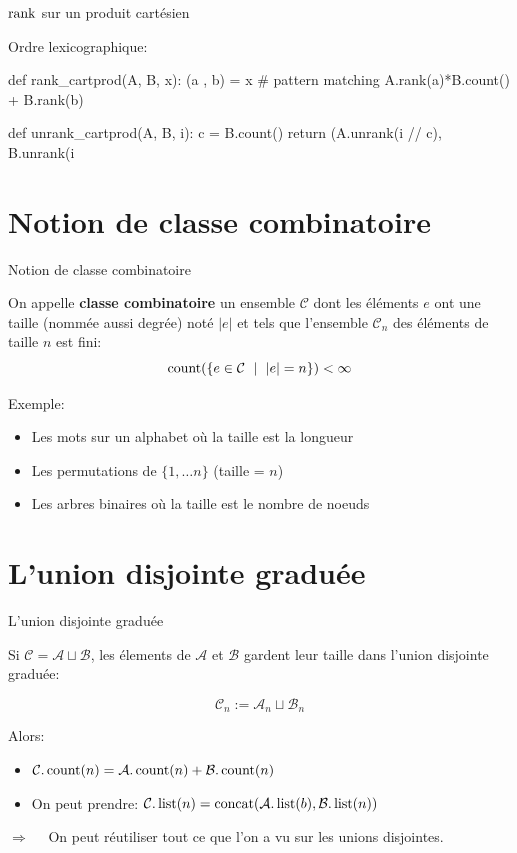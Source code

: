 \documentclass{beamer}
\begin{document}
\begin{frame}[fragile]{$\operatorname{rank}$ sur un produit cartésien}

  Ordre lexicographique:
  \bigskip
\begin{listing}{1}
    def rank_cartprod(A, B, x):
        (a , b) = x      # pattern matching
        A.rank(a)*B.count() + B.rank(b)

    def unrank_cartprod(A, B, i):
        c = B.count()
        return (A.unrank(i // c), B.unrank(i %
\end{listing}
\end{frame}


\newcommand{\mA}{\mathcal{A}}
\newcommand{\mB}{\mathcal{B}}
\newcommand{\mC}{\mathcal{C}}
\newcommand{\mD}{\mathcal{D}}
\newcommand{\mE}{\mathcal{E}}
\newcommand{\mI}{\mathcal{I}}
\newcommand{\mZ}{\mathcal{Z}}
\section{Notion de classe combinatoire}

\begin{frame}{Notion de classe combinatoire}
  \begin{DEFN}
    On appelle \textbf{classe combinatoire} un ensemble $\mC$ dont les éléments
    $e$ ont une taille (nommée aussi degrée) noté $|e|$ et tels que l'ensemble
    $\mC_n$ des éléments de taille $n$ est fini:
    \[
    \Count(\{e\in \mC\ \mid\ |e| = n\}) < \infty
    \]
  \end{DEFN}
  Exemple:
  \begin{itemize}
  \item Les mots sur un alphabet où la taille est la longueur
  \item Les permutations de $\{1,\dots n\}$ (taille = $n$)
  \item Les arbres binaires où la taille est le nombre de noeuds
  \end{itemize}
\end{frame}

\section{L'union disjointe graduée}
\begin{frame}{L'union disjointe graduée}

  Si $\mC = \mA \sqcup \mB$, les élements de $\mA$ et $\mB$ gardent leur
  taille dans l'union disjointe graduée:

  \[\mC_n := \mA_n \sqcup \mB_n\]

  Alors:
  \begin{itemize}
  \item $\mC.\Count(n) = \mA.\Count(n) + \mB.\Count(n)$
  \item On peut prendre: $\mC.\List(n) = \Concat(\mA.\List(b), \mB.\List(n))$
  \end{itemize}
  \bigskip\pause

  $\Longrightarrow\quad$ On peut réutiliser tout ce que l'on a vu sur les
  unions disjointes.
\end{frame}
\end{document}
